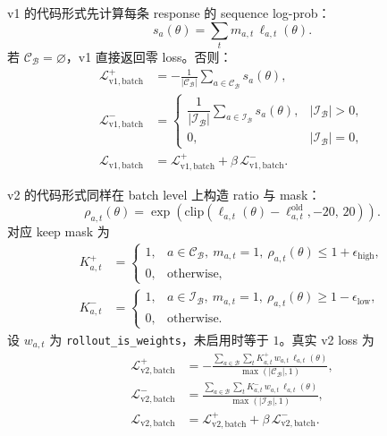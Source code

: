 v1 的代码形式先计算每条 response 的 sequence log-prob：
\begin{equation}
    s_a(\theta)=\sum_t m_{a,t}\,\ell_{a,t}(\theta).
\end{equation}
若 $\mathcal{C}_{\mathcal{B}}=\varnothing$，v1 直接返回零 loss。否则：
\begin{align}
    \mathcal{L}^{+}_{\mathrm{v1,batch}}
        &=
        -\frac{1}{|\mathcal{C}_{\mathcal{B}}|}
        \sum_{a\in\mathcal{C}_{\mathcal{B}}}
        s_a(\theta), \\
    \mathcal{L}^{-}_{\mathrm{v1,batch}}
        &=
        \begin{cases}
            \dfrac{1}{|\mathcal{I}_{\mathcal{B}}|}
            \sum_{a\in\mathcal{I}_{\mathcal{B}}}
            s_a(\theta),
            & |\mathcal{I}_{\mathcal{B}}|>0,\\
            0,
            & |\mathcal{I}_{\mathcal{B}}|=0,
        \end{cases} \\
    \mathcal{L}_{\mathrm{v1,batch}}
        &=
        \mathcal{L}^{+}_{\mathrm{v1,batch}}
        +
        \beta\,\mathcal{L}^{-}_{\mathrm{v1,batch}}.
\end{align}

v2 的代码形式同样在 batch level 上构造 ratio 与 mask：
\begin{equation}
    \rho_{a,t}(\theta)
    =
    \exp\!\left(
        \mathrm{clip}\left(
            \ell_{a,t}(\theta)-\ell^{\mathrm{old}}_{a,t},
            -20,\,
            20
        \right)
    \right).
\end{equation}
对应 keep mask 为
\begin{align}
    K^+_{a,t}
    &=
    \begin{cases}
        1,
        & a\in\mathcal{C}_{\mathcal{B}},\ m_{a,t}=1,\ \rho_{a,t}(\theta)\le 1+\epsilon_{\mathrm{high}},\\
        0,
        & \text{otherwise},
    \end{cases} \\
    K^-_{a,t}
    &=
    \begin{cases}
        1,
        & a\in\mathcal{I}_{\mathcal{B}},\ m_{a,t}=1,\ \rho_{a,t}(\theta)\ge 1-\epsilon_{\mathrm{low}},\\
        0,
        & \text{otherwise}.
    \end{cases}
\end{align}
设 $w_{a,t}$ 为 \texttt{rollout\_is\_weights}，未启用时等于 $1$。真实 v2 loss 为
\begin{align}
    \mathcal{L}^{+}_{\mathrm{v2,batch}}
        &=
        -\frac{
            \sum_{a\in\mathcal{B}}\sum_t
            K^+_{a,t}\,w_{a,t}\,\ell_{a,t}(\theta)
        }{
            \max(|\mathcal{C}_{\mathcal{B}}|,1)
        }, \\
    \mathcal{L}^{-}_{\mathrm{v2,batch}}
        &=
        \frac{
            \sum_{a\in\mathcal{B}}\sum_t
            K^-_{a,t}\,w_{a,t}\,\ell_{a,t}(\theta)
        }{
            \max(|\mathcal{I}_{\mathcal{B}}|,1)
        }, \\
    \mathcal{L}_{\mathrm{v2,batch}}
        &=
        \mathcal{L}^{+}_{\mathrm{v2,batch}}
        +
        \beta\,\mathcal{L}^{-}_{\mathrm{v2,batch}}.
\end{align}

